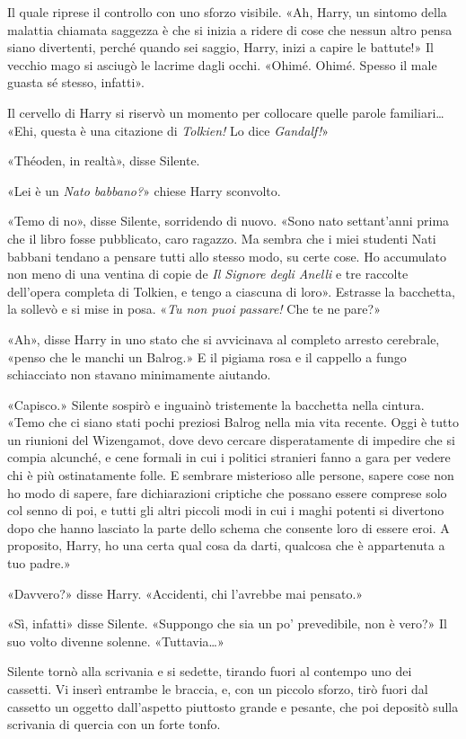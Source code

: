 Il quale riprese il controllo con uno sforzo visibile. «Ah, Harry, un sintomo della malattia chiamata saggezza è che si inizia a ridere di cose che nessun altro pensa siano divertenti, perché quando sei saggio, Harry, inizi a capire le battute!» Il vecchio mago si asciugò le lacrime dagli occhi. «Ohimé. Ohimé. Spesso il male guasta sé stesso, infatti».

Il cervello di Harry si riservò un momento per collocare quelle parole familiari… «Ehi, questa è una citazione di \textit{Tolkien!} Lo dice \textit{Gandalf!}»

«Théoden, in realtà», disse Silente.

«Lei è un \textit{Nato babbano?}» chiese Harry sconvolto.

«Temo di no», disse Silente, sorridendo di nuovo. «Sono nato settant’anni prima che il libro fosse pubblicato, caro ragazzo. Ma sembra che i miei studenti Nati babbani tendano a pensare tutti allo stesso modo, su certe cose. Ho accumulato non meno di una ventina di copie de \textit{Il Signore degli Anelli} e tre raccolte dell’opera completa di Tolkien, e tengo a ciascuna di loro». Estrasse la bacchetta, la sollevò e si mise in posa. «\textit{Tu non puoi passare!} Che te ne pare?»

«Ah», disse Harry in uno stato che si avvicinava al completo arresto cerebrale, «penso che le manchi un Balrog.» E il pigiama rosa e il cappello a fungo schiacciato non stavano minimamente aiutando.

«Capisco.» Silente sospirò e inguainò tristemente la bacchetta nella cintura. «Temo che ci siano stati pochi preziosi Balrog nella mia vita recente. Oggi è tutto un riunioni del Wizengamot, dove devo cercare disperatamente di impedire che si compia alcunché, e cene formali in cui i politici stranieri fanno a gara per vedere chi è più ostinatamente folle. E sembrare misterioso alle persone, sapere cose non ho modo di sapere, fare dichiarazioni criptiche che possano essere comprese solo col senno di poi, e tutti gli altri piccoli modi in cui i maghi potenti si divertono dopo che hanno lasciato la parte dello schema che consente loro di essere eroi. A proposito, Harry, ho una certa qual cosa da darti, qualcosa che è appartenuta a tuo padre.»

«Davvero?» disse Harry. «Accidenti, chi l’avrebbe mai pensato.»

«Sì, infatti» disse Silente. «Suppongo che sia un po’ prevedibile, non è vero?» Il suo volto divenne solenne. «Tuttavia…»

Silente tornò alla scrivania e si sedette, tirando fuori al contempo uno dei cassetti. Vi inserì entrambe le braccia, e, con un piccolo sforzo, tirò fuori dal cassetto un oggetto dall’aspetto piuttosto grande e pesante, che poi depositò sulla scrivania di quercia con un forte tonfo.


